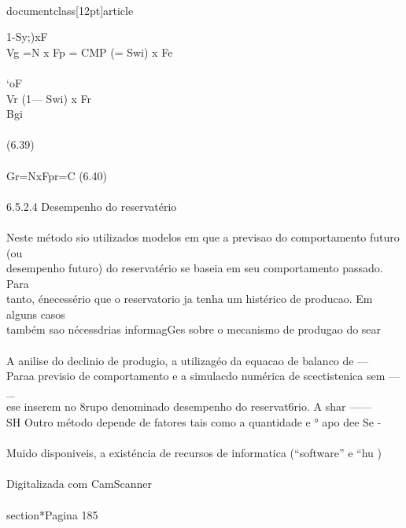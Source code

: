 \\documentclass[12pt]{article}
\begin{document}
1-Sy;)xF\\
Vg =N x Fp = CMP (= Swi) x Fe\\
\\
‘oF\\
Vr (1— Swi) x Fr\\
Bgi\\
\\
(6.39)\\
\\
Gr=NxFpr=C (6.40)\\
\\
6.5.2.4 Desempenho do reservatério\\
\\
Neste método sio utilizados modelos em que a previsao do comportamento futuro (ou\\
desempenho futuro) do reservatério se baseia em seu comportamento passado. Para\\
tanto, énecessério que o reservatorio ja tenha um histérico de producao. Em alguns casos\\
também sao nécessdrias informagGes sobre o mecanismo de produgao do sear\\
\\
A anilise do declinio de produgio, a utilizagéo da equacao de balanco de —\\
Paraa previsio de comportamento e a simulacdo numérica de scectistenica sem —\\_\\
ese inserem no 8rupo denominado desempenho do reservat6rio. A shar ——\\
SH Outro método depende de fatores tais como a quantidade e ° apo dee Se -\\
\\
Muido disponiveis, a existéncia de recursos de informatica (“software” e “hu )\\
\\
Digitalizada com CamScanner\\

\\section*{Pagina 185}
\end{document}
